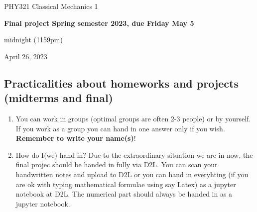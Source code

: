 \documentclass[%
oneside,                 %
final,                   %
10pt]{article}
\begin{document}

\newcommand{\exercisesection}[1]{\subsection*{#1}}






\thispagestyle{empty}

\begin{center}
{\LARGE\bf
\begin{spacing}{1.25}
PHY321 Classical Mechanics 1
\end{spacing}
}
\end{center}


\begin{center}
{\bf Final  project Spring semester 2023, due Friday May 5}
\end{center}

    \begin{center}
\centerline{{\small midnight (1159pm)}}
\end{center}
    

\begin{center}
April 26, 2023
\end{center}

\vspace{1cm}


\subsection{Practicalities about  homeworks and projects (midterms and final)}

\begin{enumerate}
\item You can work in groups (optimal groups are often 2-3 people) or by yourself. If you work as a group you can hand in one answer only if you wish. \textbf{Remember to write your name(s)}!

\item How do I(we)  hand in?  Due to the extraordinary situation we are in now, the final projec should be handed in fully via D2L. You can scan your handwritten notes and upload to D2L or you can hand in everyhting (if you are ok with typing mathematical formulae using say Latex) as a jupyter notebook at D2L. The numerical part should always be handed in as a jupyter notebook.
\end{enumerate}
\end{document}
